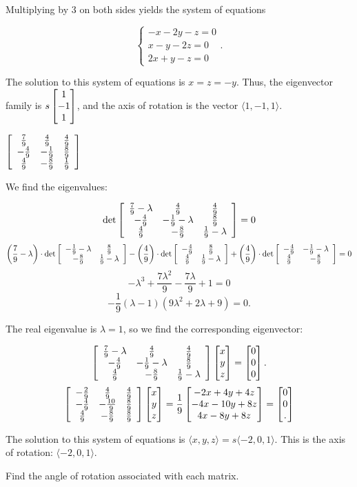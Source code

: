 \documentclass[../key.tex]{subfiles}
\begin{document}
{{Multiplying by $3$ on both sides yields the system of equations

$$\begin{cases} -x -2y -z = 0 \\x-y-2z = 0 \\ 2x + y - z = 0 \end{cases}.$$

The solution to this system of equations is $x=z=-y$. Thus, the eigenvector family is $s\begin{bmatrix} 1 \\ -1 \\ 1 \end{bmatrix}$, and the axis of rotation is the vector $\langle 1, -1, 1\rangle$.

\begin{iinner_problem}[start=1]
\item $\left[\begin{array}{ccc} \frac{7}{9} & \frac{4}{9} & \frac{4}{9} \\ -\frac{4}{9} & -\frac{1}{9} & \frac{8}{9} \\ \frac{4}{9} & -\frac{8}{9} & \frac{1}{9} \end{array}\right]$
\end{iinner_problem}

We find the eigenvalues:

$$\det \left[\begin{array}{ccc} \frac{7}{9}-\lambda & \frac{4}{9} & \frac{4}{9} \\ -\frac{4}{9} & -\frac{1}{9}-\lambda & \frac{8}{9} \\ \frac{4}{9} & -\frac{8}{9} & \frac{1}{9}-\lambda \end{array}\right] = 0$$
$$\left(\frac{7}{9}-\lambda\right) \cdot \det \left[\begin{array}{cc} -\frac{1}{9}-\lambda & \frac{8}{9} \\ -\frac{8}{9} & \frac{1}{9}-\lambda \end{array}\right] - \left(\frac{4}{9}\right) \cdot \det \left[\begin{array}{cc} -\frac{4}{9} & \frac{8}{9} \\ \frac{4}{9} & \frac{1}{9}-\lambda \end{array}\right] + \left(\frac{4}{9}\right) \cdot \det \left[\begin{array}{cc} -\frac{4}{9} & -\frac{1}{9}-\lambda \\ \frac{4}{9} & -\frac{8}{9} \end{array}\right] = 0$$
$$-\lambda^3 + \frac{7 \lambda^2}{9} - \frac{7 \lambda}{9} + 1=0$$
$$-\frac{1}{9} (\lambda - 1) (9 \lambda^2 + 2 \lambda + 9) = 0.$$

The real eigenvalue is $\lambda = 1$, so we find the corresponding eigenvector:

$$\left[\begin{array}{ccc} \frac{7}{9}-\lambda & \frac{4}{9} & \frac{4}{9} \\ -\frac{4}{9} & -\frac{1}{9}-\lambda & \frac{8}{9} \\ \frac{4}{9} & -\frac{8}{9} & \frac{1}{9}-\lambda \end{array}\right]\begin{bmatrix} x \\ y \\ z \end{bmatrix} = \begin{bmatrix} 0 \\ 0 \\ 0 \end{bmatrix}.$$
$$\left[\begin{array}{ccc} -\frac{2}{9} & \frac{4}{9} & \frac{4}{9} \\ -\frac{4}{9} & -\frac{10}{9} & \frac{8}{9} \\ \frac{4}{9} & -\frac{8}{9} & \frac{8}{9} \end{array}\right]\begin{bmatrix} x \\ y \\ z \end{bmatrix} = \frac{1}{9} \begin{bmatrix} -2x+4y+4z \\ -4x-10y+8z \\ 4x-8y+8z \end{bmatrix} = \begin{bmatrix} 0 \\ 0 \\ . \end{bmatrix}$$

The solution to this system of equations is $\langle x,y,z\rangle = s\langle -2, 0, 1\rangle$. This is the axis of rotation: $\langle -2,0,1\rangle$.

\begin{inner_problem}
\item Find the angle of rotation associated with each matrix.
\end{inner_problem}

}}
\end{document}
